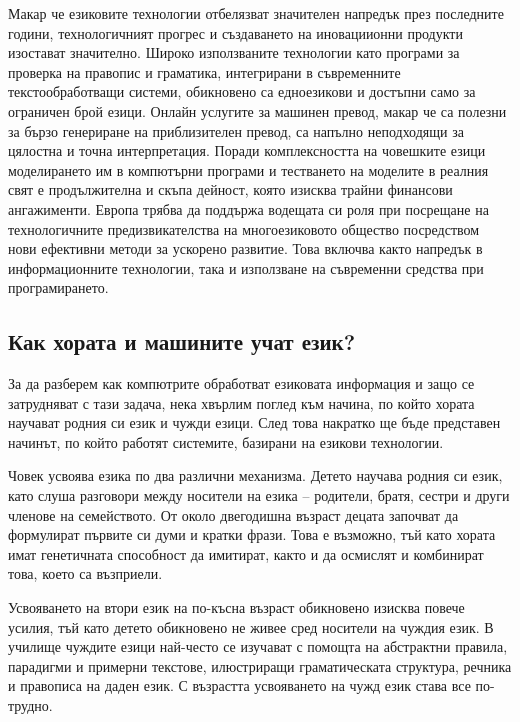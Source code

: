 \documentclass[]{../../metanetpaper}
\begin{document}
\begin{multicols}{2}
Макар че езиковите технологии отбелязват значителен
 напредък през последните години,
 технологичният прогрес и създаването на иновациионни продукти изостават значително. Широко използваните технологии като програми за проверка на правопис и граматика, интегрирани в съвременните текстообработващи системи, 
обикновено са едноезикови и достъпни само за ограничен брой езици. 
Онлайн услугите за машинен превод, макар че са полезни за бързо генериране на приблизителен превод, са напълно неподходящи за цялостна и точна интерпретация. Поради комплексността на човешките езици моделирането им в компютърни програми и тестването на моделите в реалния свят е продължителна и скъпа дейност, която изисква трайни финансови ангажименти.  
Европа трябва да поддържа водещата си роля при посрещане на технологичните предизвикателства на многоезиковото общество посредством нови ефективни методи за ускорено развитие. Това включва както напредък в информационните технологии, така и използване на съвременни средства при програмирането.



\subsection{Как хората и машините учат език?}

За да разберем как компютрите обработват езиковата информация и защо се затрудняват с тази задача, нека хвърлим поглед към начина, по който хората научават родния си език и чужди езици. След това
 накратко ще бъде представен начинът, по който работят системите, базирани на езикови технологии.

Човек усвоява езика по два различни механизма. Детето
 научава родния си език, като слуша разговори между
 носители на езика – родители, братя, сестри и други
 членове на семейството. От около двегодишна възраст децата започват да формулират първите си думи и кратки фрази. Това е възможно, тъй като хората имат генетичната способност да имитират, както и да осмислят и комбинират това, което са възприели.

Усвояването на втори език на по-късна възраст обикновено изисква
 повече усилия, тъй като детето обикновено не живее сред
 носители на чуждия език. В училище чуждите езици най-често се изучават с помощта на абстрактни правила, парадигми и примерни текстове, илюстриращи  граматическата структура, речника и правописа на даден език. С възрастта  усвояването на чужд език става все по-трудно.


\end{multicols}
\end{document}
